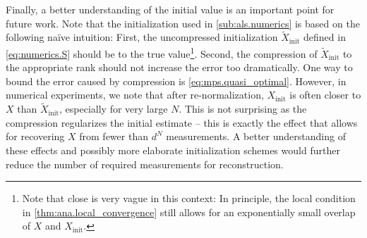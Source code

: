 Finally, a better understanding of the initial value is an important point for future work.
Note that the initialization used in \cref{sub:als.numerics} is based on the following na\"ive intuition:
First, the uncompressed initialization $\tilde X_\mathrm{init}$ defined in \cref{eq:numerics.S} should be  to the true value\footnote{%
  Note that close is very vague in this context:
  In principle, the local condition in \cref{thm:ana.local_convergence} still allows for an exponentially small overlap of $X$ and $X_\mathrm{init}$.
}.
Second, the compression of $\tilde X_\mathrm{init}$ to the appropriate rank should not increase the error too dramatically.
One way to bound the error caused by compression is \cref{eq:mps.quasi_optimal}.
However, in numerical experiments, we note that after re-normalization, $X_\mathrm{init}$ is often closer to $X$ than $\tilde X_\mathrm{init}$, especially for very large $N$.
This is not surprising as the compression regularizes the initial estimate -- this is exactly the effect that allows for recovering $X$ from fewer than $d^N$ measurements.
A better understanding of these effects and possibly more elaborate initialization schemes would further reduce the number of required measurements for reconstruction.

